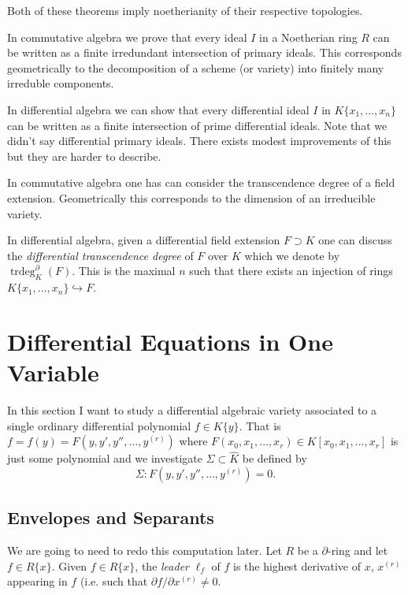 \documentclass[12pt]{book}
\numberwithin{equation}{section}
\theoremstyle{definition}
\theoremstyle{remark}
\newcommand{\trdeg}{\operatorname{trdeg}}
\begin{document}
\begin{description}[leftmargin=*]
Both of these theorems imply noetherianity of their respective topologies.

\item[Primary Decompositions] In commutative algebra we prove that every ideal $I$ in a Noetherian ring $R$ can be written as a finite irredundant intersection of primary ideals. 
This corresponds geometrically to the decomposition of a scheme (or variety) into finitely many  irreduble components.

In differential algebra we can show that every differential ideal $I$ in $K\lbrace x_1,\ldots,x_n\rbrace$ can be written as a finite intersection of prime differential ideals.
Note that we didn't say differential primary ideals.
There exists modest improvements of this but they are harder to describe.

\item[Transcendence Degrees] 

In commutative algebra one has can consider the transcendence degree of a field extension. 
Geometrically this corresponds to the dimension of an irreducible variety.

In differential algebra, given a differential field extension $F\supset K$ one can discuss the \emph{differential transcendence degree} of $F$ over $K$ which we denote by $\trdeg_K^{\partial}(F)$.
This is the maximal $n$ such that there exists an injection of rings $K\lbrace x_1,\ldots,x_n\rbrace\hookrightarrow F$.
\end{description}



\section{Differential Equations in One Variable}

In this section I want to study a differential algebraic variety associated to a single ordinary differential polynomial $f \in K\lbrace y \rbrace$.
That is $f = f(y) = F(y,y',y'',\ldots,y^{(r)})$ where $F(x_0,x_1,\ldots,x_r) \in K[x_0,x_1,\ldots,x_r]$ is just some polynomial and we investigate  $\Sigma \subset \widehat{K}$ be defined by 
 $$ \Sigma\colon F(y,y',y'',\ldots, y^{(r)}) =0. $$


\subsection{Envelopes and Separants}
We are going to need to redo this computation later.
Let $R$ be a $\partial$-ring and let $f \in R\lbrace x \rbrace$. 
Given $f \in R\lbrace x \rbrace$, the \emph{leader} $\ell_f$ of $f$ is the highest derivative of $x$, $x^{(r)}$ appearing in $f$ (i.e. such that $\partial f/\partial x^{(r)} \neq 0$. 
\end{document}
